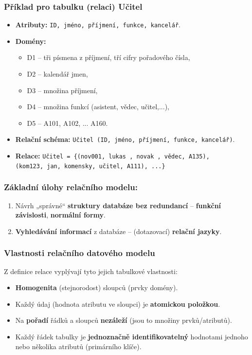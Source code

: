 \subsubsection*{Příklad pro tabulku (relaci) Učitel}
\begin{itemize}
\item \textbf{Atributy:} \texttt{ID, jméno, příjmení, funkce, kancelář}.
\item \textbf{Domény:} 
\begin{itemize}
\item D1 -- tři písmena z příjmení, tří cifry pořadového čísla,
\item D2 -- kalendář jmen,
\item D3 -- množina příjmení,
\item D4 -- množina funkcí (asistent, vědec, učitel,...),
\item D5 -- A101, A102, ... A160.
\end{itemize}
\item \textbf{Relační schéma:} \texttt{Učitel (ID, jméno, příjmení, funkce, kancelář)}.
\item \textbf{Relace:} \texttt{Učitel = \{(nov001, lukas , novak , vědec, A135),\\ (kom123, jan, komensky, učitel, A111), ...\}}
\end{itemize}

\subsubsection{Základní úlohy relačního modelu:}
\begin{enumerate}
\item Návrh „správné“ \textbf{struktury databáze bez redundancí} -- \textbf{funkční závislosti}, \textbf{normální formy}.
\item \textbf{Vyhledávání informací} z databáze -- (dotazovací) \textbf{relační jazyky}.
\end{enumerate}

\subsubsection{Vlastnosti relačního datového modelu}
Z definice relace vyplývají tyto jejich tabulkové vlastnosti:
\begin{itemize}
\item \textbf{Homogenita} (stejnorodost) sloupců (prvky domény).
\item Každý údaj (hodnota atributu ve sloupci) je \textbf{atomickou položkou}.
\item Na \textbf{pořadí} řádků a sloupců \textbf{nezáleží} (jsou to množiny prvků/atributů).
\item Každý řádek tabulky je \textbf{jednoznačně identifikovatelný} hodnotami jednoho nebo několika atributů (primárního klíče).
\end{itemize}

